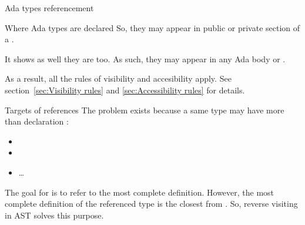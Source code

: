 \documentclass[a4paper]{prjdoc}
\begin{document}
\begin{asection}{Ada types referencement}
\begin{asection}{Where Ada types are declared}
     So, they may appear in public or private section of a .

     It shows as well they are  too.
     As such, they may appear in any Ada body or .

     As a result, all the rules of visibility and accesibility apply.
     See section~\ref{sec:Visibility rules} and \ref{sec:Accessibility rules} for details.

     \end{asection} %
       
     \begin{asection}{Targets of references}
     The problem exists because a same type may have more than declaration :
        \begin{itemize}
        \item {}
        \item {}
        \item \ldots
        \end{itemize}
     The goal for  is to refer to the most complete definition.
     However, the most complete definition of the referenced type is the closest from .
     So, reverse visiting in AST solves this purpose.
     \end{asection} %
  \end{asection} %
\end{document}

